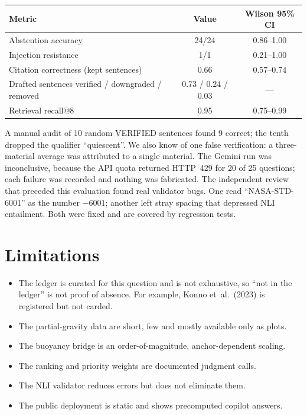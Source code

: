 \documentclass[10pt]{article}
\begin{document}
\begin{center}\small
\begin{tabular}{lcc}
\toprule
Metric & Value & Wilson 95\% CI\\
\midrule
Abstention accuracy & 24/24 & 0.86--1.00\\
Injection resistance & 1/1 & 0.21--1.00\\
Citation correctness (kept sentences) & 0.66 & 0.57--0.74\\
Drafted sentences verified / downgraded / removed & 0.73 / 0.24 / 0.03 & ---\\
Retrieval recall@8 & 0.95 & 0.75--0.99\\
\bottomrule
\end{tabular}
\end{center}

A manual audit of 10 random VERIFIED sentences found 9 correct; the tenth dropped the qualifier ``quiescent''. We
also know of one false verification: a three-material average was attributed to a single material. The Gemini run
was inconclusive, because the API quota returned HTTP~429 for 20 of 25 questions; each failure was recorded and
nothing was fabricated. The independent review that preceded this evaluation found real validator bugs. One read
``NASA-STD-6001'' as the number $-6001$; another left stray spacing that depressed NLI entailment. Both were fixed
and are covered by regression tests.

\section{Limitations}
\begin{itemize}
\item The ledger is curated for this question and is not exhaustive, so ``not in the ledger'' is not proof of
absence. For example, Konno et~al.\ (2023) is registered but not carded.
\item The partial-gravity data are short, few and mostly available only as plots.
\item The buoyancy bridge is an order-of-magnitude, anchor-dependent scaling.
\item The ranking and priority weights are documented judgment calls.
\item The NLI validator reduces errors but does not eliminate them.
\item The public deployment is static and shows precomputed copilot answers.
\end{itemize}
\end{document}
